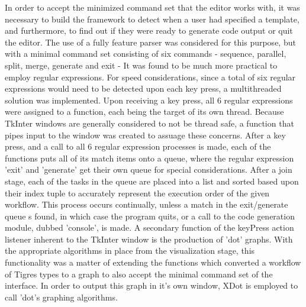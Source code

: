 	In order to accept the minimized command set that the editor works with, it was necessary to build the framework to detect when a user had specified a template, and furthermore, to find out if they were ready to generate code output or quit the editor. The use of a fully feature parser was considered for this purpose, but with a minimal command set consisting of six commands - sequence, parallel, split, merge, generate and exit - It was found to be much more practical to employ regular expressions. For speed considerations, since a total of six regular expressions would need to be detected upon each key press, a multithreaded solution was implemented. Upon receiving a key press, all 6 regular expressions were assigned to a function, each being the target of its own thread. Because TkInter windows are generally considered to not be thread safe, a function that pipes input to the window was created to assuage these concerns. After a key press, and a call to all 6 regular expression processes is made, each of the functions puts all of its match items onto a queue, where the regular expression 'exit' and 'generate' get their own queue for special considerations. After a join stage, each of the tasks in the queue are placed into a list and sorted based upon their index tuple to accurately represent the execution order of the given workflow. This process occurs continually, unless a match in the exit/generate queue s found, in which case the program quits, or a call to the code generation module, dubbed 'console', is made. A secondary function of the keyPress action listener inherent to the TkInter window is the production of 'dot' graphs. With the appropriate algorithms in place from the visualization stage, this functionality was a matter of extending the functions which converted a workflow of Tigres types to a graph to also accept the minimal command set of the interface. In order to output this graph in it's own window, XDot is employed to call 'dot's graphing algorithms. 